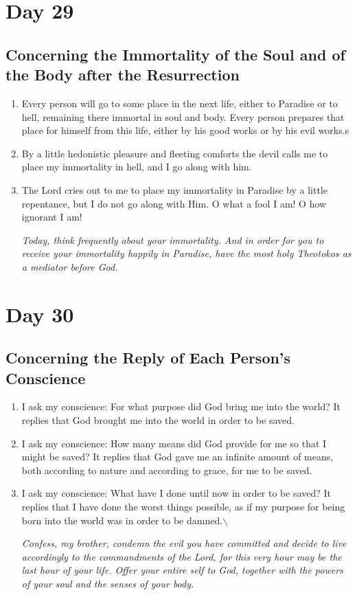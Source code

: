 \documentclass[11pt]{article}
\begin{document}
\section{Day 29}
\label{sec:org0225f47}
\subsection{Concerning the Immortality of the Soul and of the Body after the Resurrection}
\label{sec:org1ad295f}
\begin{enumerate}
\item Every person will go to some place in the next life, either to Paradise or to hell, remaining there immortal in soul and body. Every person prepares that place for himself from this life, either by his good works or by his evil works.s
\item By a little hedonistic pleasure and fleeting comforts the devil calls me to place my immortality in hell, and I go along with him.
\item The Lord cries out to me to place my immortality in Paradise by a little repentance, but I do not go along with Him. O what a fool I am! O how ignorant I am!

\emph{Today, think frequently about your immortality. And in order for you to receive your immortality happily in Paradise, have the most holy Theotokos as a mediator before God.}
\end{enumerate}
\section{Day 30}
\label{sec:orge8b60db}
\subsection{Concerning the Reply of Each Person's Conscience}
\label{sec:org42d53cb}
\begin{enumerate}
\item I ask my conscience: For what purpose did God bring me into the world? It replies that God brought me into the world in order to be saved.
\item I ask my conscience: How many means did God provide for me so that I might be saved? It replies that God gave me an infinite amount of means, both according to nature and according to grace, for me to be saved.
\item I ask my conscience: What have I done until now in order to be saved? It replies that I have done the worst things possible, as if my purpose for being born into the world was in order to be damned.$\backslash$

\emph{Confess, my brother, condemn the evil you have committed and decide to live accordingly to the commandments of the Lord, for this}
\emph{very hour may be the last hour of your life. Offer your entire self to God, together with the powers of your soul and the senses of your body.}
\end{enumerate}
\end{document}
